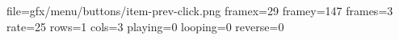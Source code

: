 file=gfx/menu/buttons/item-prev-click.png
framex=29
framey=147
frames=3
rate=25
rows=1
cols=3
playing=0
looping=0
reverse=0